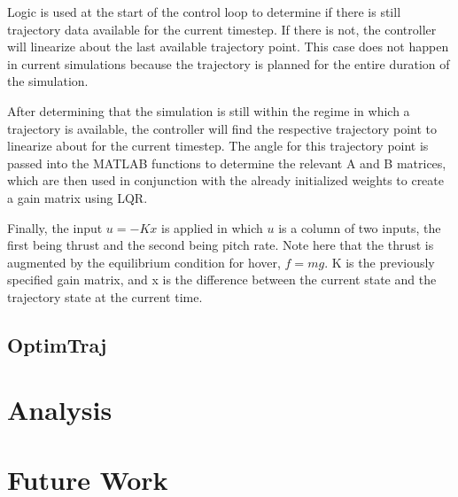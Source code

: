 \documentclass[12pt]{article}
\begin{document}
Logic is used at the start of the control loop to determine if there is still trajectory data available for the current timestep.  If there is not, the controller will linearize about the last available trajectory point.  This case does not happen in current simulations because the trajectory is planned for the entire duration of the simulation.

After determining that the simulation is still within the regime in which a trajectory is available, the controller will find the respective trajectory point to linearize about for the current timestep.  The angle for this trajectory point is passed into the MATLAB functions to determine the relevant A and B matrices, which are then used in conjunction with the already initialized weights to create a gain matrix using LQR.

Finally, the input $u = -Kx$ is applied in which $u$ is a column of two inputs, the first being thrust and the second being pitch rate.  Note here that the thrust is augmented by the equilibrium condition for hover, $f = mg$.  K is the previously specified gain matrix, and x is the difference between the current state and the trajectory state at the current time.

\subsection{OptimTraj}
\section{Analysis}
\section{Future Work}



\end{document}
